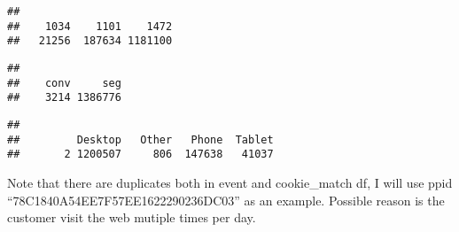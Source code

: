 \documentclass[]{article}
\newenvironment{Shaded}{\begin{snugshade}}{\end{snugshade}}
\newcommand{\KeywordTok}[1]{\textcolor[rgb]{0.13,0.29,0.53}{\textbf{#1}}}
\newcommand{\StringTok}[1]{\textcolor[rgb]{0.31,0.60,0.02}{#1}}
\newcommand{\CommentTok}[1]{\textcolor[rgb]{0.56,0.35,0.01}{\textit{#1}}}
\newcommand{\OperatorTok}[1]{\textcolor[rgb]{0.81,0.36,0.00}{\textbf{#1}}}
\newcommand{\NormalTok}[1]{#1}
\begin{document}
\begin{verbatim}
## 
##    1034    1101    1472 
##   21256  187634 1181100
\end{verbatim}

\begin{Shaded}
\end{Shaded}

\begin{verbatim}
## 
##    conv     seg 
##    3214 1386776
\end{verbatim}

\begin{Shaded}
\end{Shaded}

\begin{verbatim}
## 
##         Desktop   Other   Phone  Tablet 
##       2 1200507     806  147638   41037
\end{verbatim}

Note that there are duplicates both in event and cookie\_match df, I
will use ppid ``78C1840A54EE7F57EE1622290236DC03'' as an example.
Possible reason is the customer visit the web mutiple times per day.

\begin{Shaded}
\end{Shaded}
\end{document}
